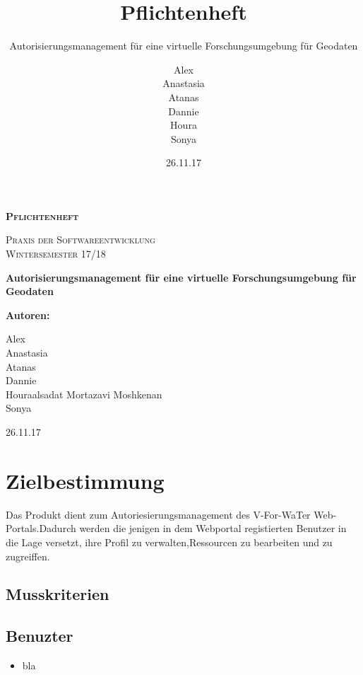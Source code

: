 \documentclass[parskip=full,11pt]{scrartcl}
\title{Pflichtenheft}
\subtitle{Autorisierungsmanagement für eine virtuelle Forschungsumgebung für Geodaten}
\author{Alex\\Anastasia\\Atanas\\Dannie\\ Houra\\Sonya\\}
\date{26.11.17}
\begin{document}
\begin{titlepage}
	
	\begin{center}
	{\scshape\LARGE\bfseries Pflichtenheft \par}
	\vspace{1cm}
	{\scshape\Large Praxis der Softwareentwicklung\\}
	\vspace{1cm}
	{\scshape\Large Wintersemester 17/18\\}
	\vspace{3cm}
	{\huge\bfseries Autorisierungsmanagement für eine virtuelle Forschungsumgebung für Geodaten\par}
	\vspace{2cm}
	\vfill
	{\bfseries {\Large Autoren}:\par}
	{\Large Alex}\\%
	{\Large Anastasia}\\%
	{\Large Atanas}\\%
	{\Large Dannie}\\%
	{\Large Houraalsadat Mortazavi Moshkenan}\\
	{\Large Sonya}\\%
	\vfill
	{\large 26.11.17 \par}
	\end{center}
\end{titlepage}
\tableofcontents

\newpage
\section{Zielbestimmung}
Das Produkt dient  zum Autoriesierungsmanagement des  \gls{V-For-WaTer} Web-Portals.Dadurch werden die jenigen in dem Webportal registierten \gls{Benutzer} in die Lage versetzt, ihre Profil zu verwalten,Ressourcen zu bearbeiten und zu zugreiffen.

\subsection{Musskriterien}
\subsection*{Benuzter}
\begin{itemize}[itemsep=0pt]
 \item bla
\end{itemize}
\end{document}
